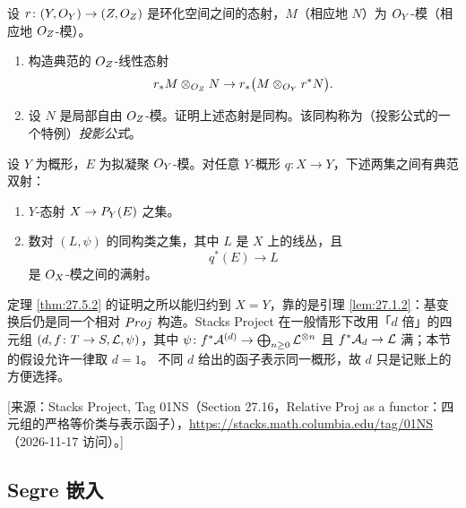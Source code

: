 \begin{exercise}\label{exc:27.5.5}
设 $r \colon (Y, O_Y) \to (Z, O_Z)$ 是环化空间之间的态射，$M$（相应地 $N$）为 $O_Y$-模（相应地 $O_Z$-模）。
\begin{enumerate}[label=(\arabic*),leftmargin=2.4em,itemsep=0.25ex]
  \item 构造典范的 $O_Z$-线性态射
  \[
  r_*M \otimes_{O_Z} N \to r_*\bigl(M \otimes_{O_Y} r^*N\bigr).
  \]
  \item 设 $N$ 是局部自由 $O_Z$-模。证明上述态射是同构。该同构称为（投影公式的一个特例）\emph{投影公式}。
\end{enumerate}
\end{exercise}

\begin{corollary}\label{cor:27.5.6}
设 $Y$ 为概形，$E$ 为拟凝聚 $O_Y$-模。对任意 $Y$-概形 $q \colon X \to Y$，下述两集之间有典范双射：
\begin{enumerate}[label=(\alph*),leftmargin=2.6em,itemsep=0.25ex]
  \item $Y$-态射 $X \to P_Y(E)$ 之集。
  \item 数对 $(L, \psi)$ 的同构类之集，其中 $L$ 是 $X$ 上的线丛，且
  \[
  q^*(E) \to L
  \]
  是 $O_X$-模之间的满射。
\end{enumerate}
\end{corollary}

\begin{yizhu}
定理 \ref{thm:27.5.2} 的证明之所以能归约到 $X = Y$，靠的是引理 \ref{lem:27.1.2}：基变换后仍是同一个相对 $Proj$ 构造。Stacks Project 在一般情形下改用「$d$ 倍」的四元组 $(d, f \colon T \to S, \mathcal{L}, \psi)$，其中 $\psi \colon f^*\mathcal A^{(d)} \to \bigoplus_{n \ge 0} \mathcal{L}^{\otimes n}$ 且 $f^*\mathcal A_d \to \mathcal{L}$ 满；本节的假设允许一律取 $d = 1$。
不同 $d$ 给出的函子表示同一概形，故 $d$ 只是记账上的方便选择。

[来源：Stacks Project, Tag 01NS（Section 27.16，Relative Proj as a functor：四元组的严格等价类与表示函子），\url{https://stacks.math.columbia.edu/tag/01NS}（2026-11-17 访问）。]
\end{yizhu}

\subsection{Segre 嵌入}\label{sec:27.6}

